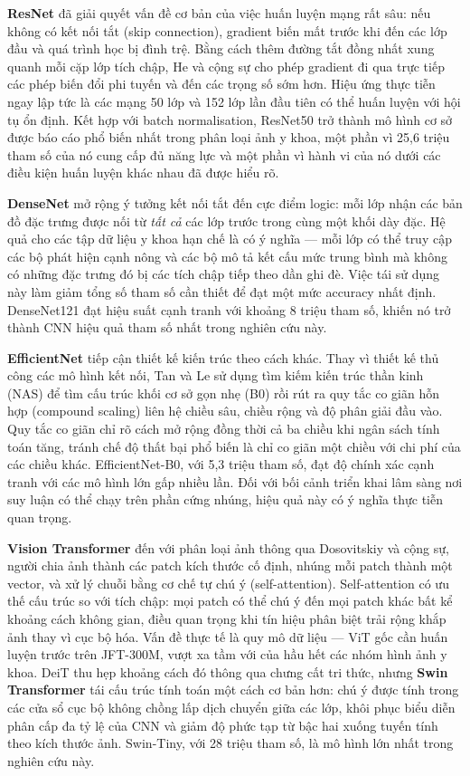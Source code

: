 \textbf{ResNet} đã giải quyết vấn đề cơ bản của việc huấn luyện mạng rất sâu: nếu không có kết nối tắt (skip connection), gradient biến mất trước khi đến các lớp đầu và quá trình học bị đình trệ. Bằng cách thêm đường tắt đồng nhất xung quanh mỗi cặp lớp tích chập, He và cộng sự cho phép gradient đi qua trực tiếp các phép biến đổi phi tuyến và đến các trọng số sớm hơn. Hiệu ứng thực tiễn ngay lập tức là các mạng 50 lớp và 152 lớp lần đầu tiên có thể huấn luyện với hội tụ ổn định. Kết hợp với batch normalisation, ResNet50 trở thành mô hình cơ sở được báo cáo phổ biến nhất trong phân loại ảnh y khoa, một phần vì 25,6 triệu tham số của nó cung cấp đủ năng lực và một phần vì hành vi của nó dưới các điều kiện huấn luyện khác nhau đã được hiểu rõ.

\textbf{DenseNet} mở rộng ý tưởng kết nối tắt đến cực điểm logic: mỗi lớp nhận các bản đồ đặc trưng được nối từ \textit{tất cả} các lớp trước trong cùng một khối dày đặc. Hệ quả cho các tập dữ liệu y khoa hạn chế là có ý nghĩa --- mỗi lớp có thể truy cập các bộ phát hiện cạnh nông và các bộ mô tả kết cấu mức trung bình mà không có những đặc trưng đó bị các tích chập tiếp theo dần ghi đè. Việc tái sử dụng này làm giảm tổng số tham số cần thiết để đạt một mức accuracy nhất định. DenseNet121 đạt hiệu suất cạnh tranh với khoảng 8 triệu tham số, khiến nó trở thành CNN hiệu quả tham số nhất trong nghiên cứu này.

\textbf{EfficientNet} tiếp cận thiết kế kiến trúc theo cách khác. Thay vì thiết kế thủ công các mô hình kết nối, Tan và Le sử dụng tìm kiếm kiến trúc thần kinh (NAS) để tìm cấu trúc khối cơ sở gọn nhẹ (B0) rồi rút ra quy tắc co giãn hỗn hợp (compound scaling) liên hệ chiều sâu, chiều rộng và độ phân giải đầu vào. Quy tắc co giãn chỉ rõ cách mở rộng đồng thời cả ba chiều khi ngân sách tính toán tăng, tránh chế độ thất bại phổ biến là chỉ co giãn một chiều với chi phí của các chiều khác. EfficientNet-B0, với 5,3 triệu tham số, đạt độ chính xác cạnh tranh với các mô hình lớn gấp nhiều lần. Đối với bối cảnh triển khai lâm sàng nơi suy luận có thể chạy trên phần cứng nhúng, hiệu quả này có ý nghĩa thực tiễn quan trọng.

\textbf{Vision Transformer} đến với phân loại ảnh thông qua Dosovitskiy và cộng sự, người chia ảnh thành các patch kích thước cố định, nhúng mỗi patch thành một vector, và xử lý chuỗi bằng cơ chế tự chú ý (self-attention). Self-attention có ưu thế cấu trúc so với tích chập: mọi patch có thể chú ý đến mọi patch khác bất kể khoảng cách không gian, điều quan trọng khi tín hiệu phân biệt trải rộng khắp ảnh thay vì cục bộ hóa. Vấn đề thực tế là quy mô dữ liệu --- ViT gốc cần huấn luyện trước trên JFT-300M, vượt xa tầm với của hầu hết các nhóm hình ảnh y khoa. DeiT thu hẹp khoảng cách đó thông qua chưng cất tri thức, nhưng \textbf{Swin Transformer} tái cấu trúc tính toán một cách cơ bản hơn: chú ý được tính trong các cửa sổ cục bộ không chồng lấp dịch chuyển giữa các lớp, khôi phục biểu diễn phân cấp đa tỷ lệ của CNN và giảm độ phức tạp từ bậc hai xuống tuyến tính theo kích thước ảnh. Swin-Tiny, với 28 triệu tham số, là mô hình lớn nhất trong nghiên cứu này.

